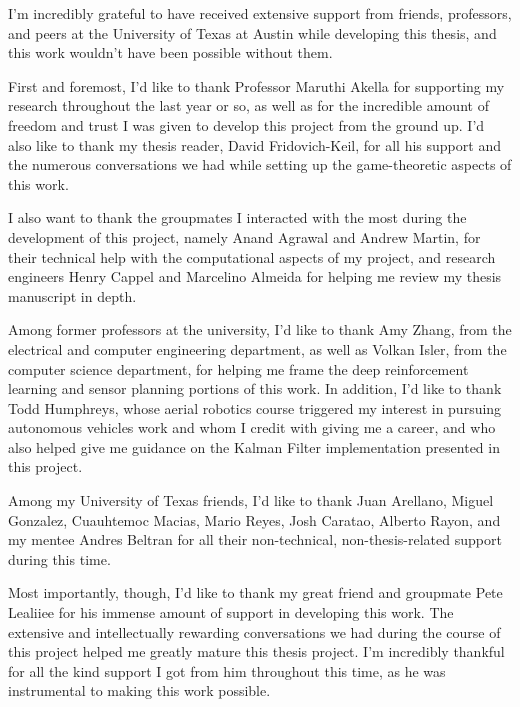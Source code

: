\begin{acknowledgments}		%


I'm incredibly grateful to have received extensive support from friends, professors, and peers at the University of Texas at Austin while developing this thesis, and this work wouldn't have been possible without them.

First and foremost, I'd like to thank Professor Maruthi Akella for supporting my research throughout the last year or so, as well as for the incredible amount of freedom and trust I was given to develop this project from the ground up. I'd also like to thank my thesis reader, David Fridovich-Keil, for all his support and the numerous conversations we had while setting up the game-theoretic aspects of this work.

I also want to thank the groupmates I interacted with the most during the development of this project, namely Anand Agrawal and Andrew Martin, for their technical help with the computational aspects of my project, and research engineers Henry Cappel and Marcelino Almeida for helping me review my thesis manuscript in depth. 

Among former professors at the university, I'd like to thank Amy Zhang, from the electrical and computer engineering department, as well as Volkan Isler, from the computer science department, for helping me frame the deep reinforcement learning and sensor planning portions of this work. In addition, I'd like to thank Todd Humphreys, whose aerial robotics course triggered my interest in pursuing autonomous vehicles work and whom I credit with giving me a career, and who also helped give me guidance on the Kalman Filter implementation presented in this project. 

Among my University of Texas friends, I'd like to thank Juan Arellano, Miguel Gonzalez, Cuauhtemoc Macias, Mario Reyes, Josh Caratao, Alberto Rayon, and my mentee Andres Beltran for all their non-technical, non-thesis-related support during this time.


Most importantly, though, I'd like to thank my great friend and groupmate Pete Lealiiee for his immense amount of support in developing this work. The extensive and intellectually rewarding conversations we had during the course of this project helped me greatly mature this thesis project. I'm incredibly thankful for all the kind support I got from him throughout this time, as he was instrumental to making this work possible.

\end{acknowledgments}

